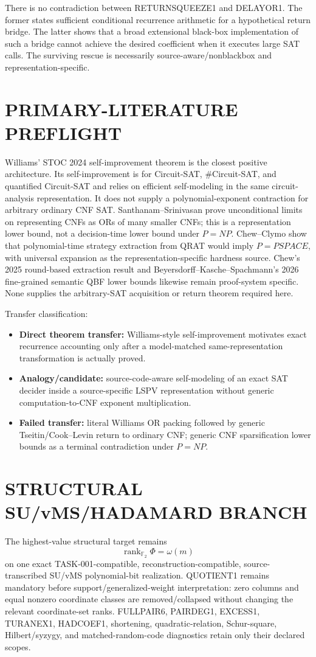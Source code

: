 \documentclass[11pt]{article}
\begin{document}
There is no contradiction between RETURNSQUEEZE1 and DELAYOR1. The former states sufficient conditional recurrence arithmetic for a hypothetical return bridge. The latter shows that a broad extensional black-box implementation of such a bridge cannot achieve the desired coefficient when it executes large SAT calls. The surviving rescue is necessarily source-aware/nonblackbox and representation-specific.

\section*{PRIMARY-LITERATURE PREFLIGHT}
Williams' STOC 2024 self-improvement theorem is the closest positive architecture. Its self-improvement is for Circuit-SAT, \#Circuit-SAT, and quantified Circuit-SAT and relies on efficient self-modeling in the same circuit-analysis representation. It does not supply a polynomial-exponent contraction for arbitrary ordinary CNF SAT. Santhanam--Srinivasan prove unconditional limits on representing CNFs as ORs of many smaller CNFs; this is a representation lower bound, not a decision-time lower bound under \(P=NP\). Chew--Clymo show that polynomial-time strategy extraction from QRAT would imply \(P=PSPACE\), with universal expansion as the representation-specific hardness source. Chew's 2025 round-based extraction result and Beyersdorff--Kasche--Spachmann's 2026 fine-grained semantic QBF lower bounds likewise remain proof-system specific. None supplies the arbitrary-SAT acquisition or return theorem required here.

Transfer classification:
\begin{itemize}
\item[] \textbf{Direct theorem transfer:} Williams-style self-improvement motivates exact recurrence accounting only after a model-matched same-representation transformation is actually proved.
\item[] \textbf{Analogy/candidate:} source-code-aware self-modeling of an exact SAT decider inside a source-specific LSPV representation without generic computation-to-CNF exponent multiplication.
\item[] \textbf{Failed transfer:} literal Williams OR packing followed by generic Tseitin/Cook--Levin return to ordinary CNF; generic CNF sparsification lower bounds as a terminal contradiction under \(P=NP\).
\end{itemize}

\section*{STRUCTURAL SU/vMS/HADAMARD BRANCH}
The highest-value structural target remains
\[
\boxed{\operatorname{rank}_{\mathbb F_2}\Phi=\omega(m)}
\]
on one exact TASK-001-compatible, reconstruction-compatible, source-transcribed SU/vMS polynomial-bit realization. QUOTIENT1 remains mandatory before support/generalized-weight interpretation: zero columns and equal nonzero coordinate classes are removed/collapsed without changing the relevant coordinate-set ranks. FULLPAIR6, PAIRDEG1, EXCESS1, TURANEX1, HADCOEF1, shortening, quadratic-relation, Schur-square, Hilbert/syzygy, and matched-random-code diagnostics retain only their declared scopes.
\end{document}
